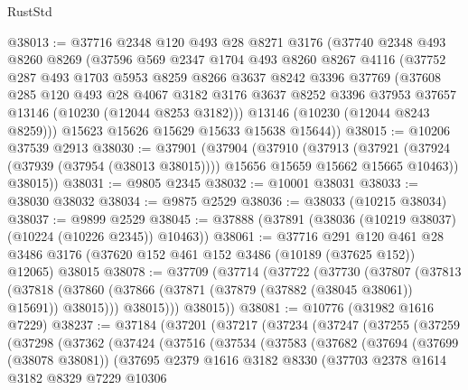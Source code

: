 \begin{lexlean}{RustStd}
\begin{coremodule}
@38013 := @37716
    @2348
    @120
    @493
    @28
    @8271
    @3176
    (@37740
      @2348
      @493
      @8260
      @8269
      (@37596
        @569
        @2347
        @1704
        @493
        @8260
        @8267
        @4116
        (@37752
          @287
          @493
          @1703
          @5953
          @8259
          @8266
          @3637
          @8242
          @3396
          @37769
          (@37608
            @285
            @120
            @493
            @28
            @4067
            @3182
            @3176
            @3637
            @8252
            @3396
            @37953
            @37657
            @13146
            (@10230 (@12044 @8253 @3182)))
          @13146
          (@10230 (@12044 @8243 @8259)))
        @15623
        @15626
        @15629
        @15633
        @15638
        @15644))
@38015 := @10206 @37539 @2913
@38030 := @37901
    (@37904
      (@37910
        (@37913
          (@37921 (@37924 (@37939 (@37954 (@38013 @38015)))) @15656 @15659 @15662 @15665 @10463))
        @38015))
@38031 := @9805 @2345
@38032 := @10001 @38031
@38033 := @38030 @38032
@38034 := @9875 @2529
@38036 := @38033 (@10215 @38034)
@38037 := @9899 @2529
@38045 := @37888 (@37891 (@38036 (@10219 @38037) (@10224 (@10226 @2345)) @10463))
@38061 := @37716
    @291
    @120
    @461
    @28
    @3486
    @3176
    (@37620 @152 @461 @152 @3486 (@10189 (@37625 @152)) @12065)
    @38015
@38078 := @37709
    (@37714
      (@37722
        (@37730
          (@37807
            (@37813
              (@37818 (@37860 (@37866 (@37871 (@37879 (@37882 (@38045 @38061)) @15691)) @38015)))
              @38015)))
        @38015))
@38081 := @10776 (@31982 @1616 @7229)
@38237 := @37184
    (@37201
      (@37217
        (@37234
          (@37247
            (@37255
              (@37259
                (@37298
                  (@37362
                    (@37424
                      (@37516
                        (@37534
                          (@37583
                            (@37682
                              (@37694
                                (@37699 (@38078 @38081))
                                (@37695
                                  @2379
                                  @1616
                                  @3182
                                  @8330
                                  (@37703
                                    @2378
                                    @1614
                                    @3182
                                    @8329
                                    @7229
                                    @10306

\end{coremodule}
\end{lexlean}
